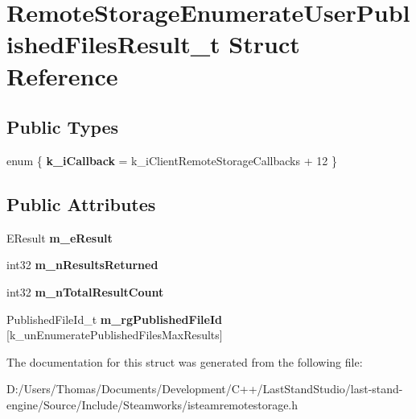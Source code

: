 \hypertarget{structRemoteStorageEnumerateUserPublishedFilesResult__t}{}\section{Remote\+Storage\+Enumerate\+User\+Published\+Files\+Result\+\_\+t Struct Reference}
\label{structRemoteStorageEnumerateUserPublishedFilesResult__t}
\subsection*{Public Types}
\begin{DoxyCompactItemize}
\item 
\hypertarget{structRemoteStorageEnumerateUserPublishedFilesResult__t_affc31829a5e3947767c0896b6c52f9f9}{}enum \{ {\bfseries k\+\_\+i\+Callback} = k\+\_\+i\+Client\+Remote\+Storage\+Callbacks + 12
 \}\label{structRemoteStorageEnumerateUserPublishedFilesResult__t_affc31829a5e3947767c0896b6c52f9f9}

\end{DoxyCompactItemize}
\subsection*{Public Attributes}
\begin{DoxyCompactItemize}
\item 
\hypertarget{structRemoteStorageEnumerateUserPublishedFilesResult__t_a58218037e715599b5242684613dde186}{}E\+Result {\bfseries m\+\_\+e\+Result}\label{structRemoteStorageEnumerateUserPublishedFilesResult__t_a58218037e715599b5242684613dde186}

\item 
\hypertarget{structRemoteStorageEnumerateUserPublishedFilesResult__t_ab6ff1eb9aaf3b51bcaf6aac070e4bc80}{}int32 {\bfseries m\+\_\+n\+Results\+Returned}\label{structRemoteStorageEnumerateUserPublishedFilesResult__t_ab6ff1eb9aaf3b51bcaf6aac070e4bc80}

\item 
\hypertarget{structRemoteStorageEnumerateUserPublishedFilesResult__t_a02d38a487ff7bfba100c5c3d12f9cf86}{}int32 {\bfseries m\+\_\+n\+Total\+Result\+Count}\label{structRemoteStorageEnumerateUserPublishedFilesResult__t_a02d38a487ff7bfba100c5c3d12f9cf86}

\item 
\hypertarget{structRemoteStorageEnumerateUserPublishedFilesResult__t_aa865c8a8fcc40e8b72fdba5c0085930e}{}Published\+File\+Id\+\_\+t {\bfseries m\+\_\+rg\+Published\+File\+Id} \mbox{[}k\+\_\+un\+Enumerate\+Published\+Files\+Max\+Results\mbox{]}\label{structRemoteStorageEnumerateUserPublishedFilesResult__t_aa865c8a8fcc40e8b72fdba5c0085930e}

\end{DoxyCompactItemize}


The documentation for this struct was generated from the following file\+:\begin{DoxyCompactItemize}
\item 
D\+:/\+Users/\+Thomas/\+Documents/\+Development/\+C++/\+Last\+Stand\+Studio/last-\/stand-\/engine/\+Source/\+Include/\+Steamworks/isteamremotestorage.\+h\end{DoxyCompactItemize}
